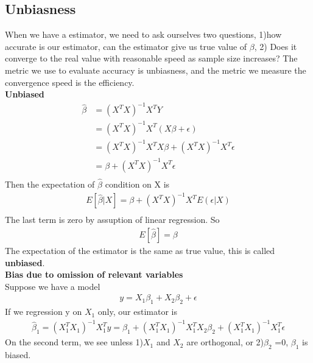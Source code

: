 \documentclass[a4paper]{article}
\begin{document}
\subsection{Unbiasness}
When we have a estimator, we need to ask ourselves two questions, 1)how accurate is our estimator, can the estimator give us true value of $\beta$, 2) Does it converge to the real value with reasonable speed as sample size increases? The metric we use to evaluate accuracy is unbiasness, and the metric we measure the convergence speed is the efficiency.\\ 
{\bf Unbiased}\\
\begin{align*}
\hat \beta & = (X^T X)^{-1}X^TY\\
               & = (X^T X)^{-1}X^T(X \beta + \epsilon)\\
               & = (X^T X)^{-1}X^T X \beta   + (X^T X)^{-1}X^T \epsilon\\
               & = \beta +  (X^T X)^{-1}X^T \epsilon\\
\end{align*}
Then the expectation of $\hat \beta$ condition on X is
\begin{align*}
E[{\hat \beta|X}] = \beta + (X^TX)^{-1} X^T E(\epsilon|X)\\
\end{align*}
The last term is zero by assuption of linear regression. So 
\begin{align*}
E[\hat \beta] = \beta
\end{align*}
The expectation of the estimator is the same as true value, this is called {\bf unbiased}. \\
{\bf Bias due to omission of relevant variables}\\
Suppose we have a model
\begin{align*}
y = X_1 \beta_1 + X_2 \beta_2 + \epsilon
\end{align*}
If we regression y on $X_1$ only, our estimator is
\begin{align*}
\hat \beta_1 = (X_1^T X_1)^{-1} X_1^T y = \beta_1 + (X_1^TX_1)^{-1}X_1^TX_2\beta_2 + (X_1^TX_1)^{-1}X_1^T\epsilon
\end{align*}
On the second term, we see unless 1)$X_1$ and $X_2$ are orthogonal, or 2)$\beta_2$ =0,  $\beta_1$ is biased.\\
\end{document}
